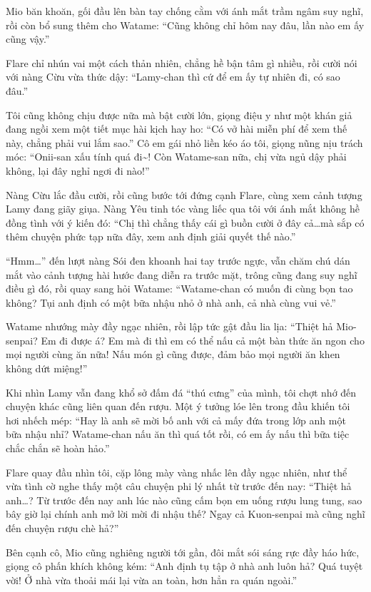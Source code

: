 \documentclass[../main.tex]{subfiles}
\begin{document}
Mio băn khoăn, gối đầu lên bàn tay chống cằm với ánh mắt trầm ngâm suy nghĩ, rồi còn bổ sung thêm cho Watame: ``Cũng không chỉ hôm nay đâu, lần nào em ấy cũng vậy.''

Flare chỉ nhún vai một cách thản nhiên, chẳng hề bận tâm gì nhiều, rồi cười nói với nàng Cừu vừa thức dậy: ``Lamy-chan thì cứ để em ấy tự nhiên đi, có sao đâu.''

Tôi cũng không chịu được nữa mà bật cười lớn, giọng điệu y như một khán giả đang ngồi xem một tiết mục hài kịch hay ho: ``Có vở hài miễn phí để xem thế này, chẳng phải vui lắm sao.'' Cô em gái nhỏ liền kéo áo tôi, giọng nũng nịu trách móc: ``Onii-san xấu tính quá đi\~{}! Còn Watame-san nữa, chị vừa ngủ dậy phải không, lại đây nghỉ ngơi đi nào!''

Nàng Cừu lắc đầu cười, rồi cũng bước tới đứng cạnh Flare, cùng xem cảnh tượng Lamy đang giãy giụa. Nàng Yêu tinh tóc vàng liếc qua tôi với ánh mắt không hề đồng tình với ý kiến đó: ``Chị thì chẳng thấy cái gì buồn cười ở đây cả\dots mà sắp có thêm chuyện phức tạp nữa đây, xem anh định giải quyết thế nào.''

``Hmm\dots'' đến lượt nàng Sói đen khoanh hai tay trước ngực, vẫn chăm chú dán mắt vào cảnh tượng hài hước đang diễn ra trước mặt, trông cũng đang suy nghĩ điều gì đó, rồi quay sang hỏi Watame: ``Watame-chan có muốn đi cùng bọn tao không? Tụi anh định có một bữa nhậu nhỏ ở nhà anh, cả nhà cùng vui vẻ.''

Watame nhướng mày đầy ngạc nhiên, rồi lập tức gật đầu lia lịa: ``Thiệt hả Mio-senpai? Em đi được á? Em mà đi thì em có thể nấu cả một bàn thức ăn ngon cho mọi người cùng ăn nữa! Nấu món gì cũng được, đảm bảo mọi người ăn khen không dứt miệng!''

Khi nhìn Lamy vẫn đang khổ sở đấm đá ``thú cưng'' của mình, tôi chợt nhớ đến chuyện khác cũng liên quan đến rượu. Một ý tưởng lóe lên trong đầu khiến tôi hơi nhếch mép: ``Hay là anh sẽ mời bố anh với cả mấy đứa trong lớp anh một bữa nhậu nhỉ? Watame-chan nấu ăn thì quá tốt rồi, có em ấy nấu thì bữa tiệc chắc chắn sẽ hoàn hảo.''

Flare quay đầu nhìn tôi, cặp lông mày vàng nhấc lên đầy ngạc nhiên, như thể vừa tình cờ nghe thấy một câu chuyện phi lý nhất từ trước đến nay: ``Thiệt hả anh\dots? Từ trước đến nay anh lúc nào cũng cấm bọn em uống rượu lung tung, sao bây giờ lại chính anh mở lời mời đi nhậu thế? Ngay cả Kuon-senpai mà cũng nghĩ đến chuyện rượu chè hả?''

Bên cạnh cô, Mio cũng nghiêng người tới gần, đôi mắt sói sáng rực đầy háo hức, giọng cô phấn khích không kém: ``Anh định tụ tập ở nhà anh luôn hả? Quá tuyệt vời! Ở nhà vừa thoải mái lại vừa an toàn, hơn hẳn ra quán ngoài.''
\end{document}
